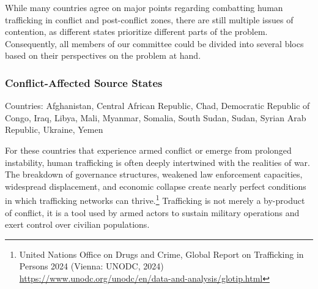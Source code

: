 While many countries agree on major points regarding combatting human trafficking in conflict and post-conflict zones, there are still multiple issues of contention, as different states prioritize different parts of the problem. Consequently, all members of our committee could be divided into several blocs based on their perspectives on the problem at hand.

\subsubsection{Conflict-Affected Source States}

Countries: Afghanistan, Central African Republic, Chad, Democratic Republic of Congo, Iraq, Libya, Mali, Myanmar, Somalia, South Sudan, Sudan, Syrian Arab Republic, Ukraine, Yemen

For these countries that experience armed conflict or emerge from prolonged instability, human trafficking is often deeply intertwined with the realities of war. The breakdown of governance structures, weakened law enforcement capacities, widespread displacement, and economic collapse create nearly perfect conditions in which trafficking networks can thrive.\footnote{United Nations Office on Drugs and Crime, Global Report on Trafficking in Persons 2024 (Vienna: UNODC, 2024) \url{https://www.unodc.org/unodc/en/data-and-analysis/glotip.html}} Trafficking is not merely a by-product of conflict, it is a tool used by armed actors to sustain military operations and exert control over civilian populations.

